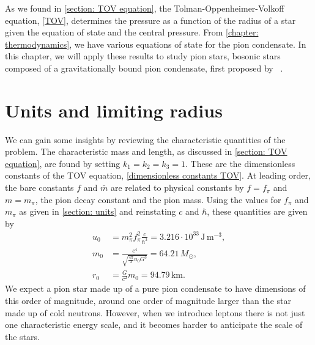 As we found in \autoref{section: TOV equation}, the Tolman-Oppenheimer-Volkoff equation, \autoref{TOV}, determines the pressure as a function of the radius of a star given the equation of state and the central pressure.
From \autoref{chapter: thermodynamics}, we have various equations of state for the pion condensate.
In this chapter, we will apply these results to study pion stars, bosonic stars composed of a gravitationally bound pion condensate, first proposed by \citeauthor{brandtNewClassCompact2018}~\autocite{brandtNewClassCompact2018}.



\section{Units and limiting radius}

We can gain some insights by reviewing the characteristic quantities of the problem.
The characteristic mass and length, as discussed in \autoref{section: TOV equation}, are found by setting $k_1 = k_2 = k_3 = 1$.
These are the dimensionless constants of the TOV equation, \autoref{dimensionless constants TOV}.
At leading order, the bare constants $f$ and $\bar m$ are related to physical constants by $f = f_\pi$ and $m = m_\pi$, the pion decay constant and the pion mass.
Using the values for $f_\pi$ and $m_\pi$ as given in \autoref{section: units} and reinstating $c$ and $\hbar$, these quantities are given by
%
\begin{align}
    u_0 & =m_\pi^2 f_\pi^2 \frac{c}{\hbar^3}
    = 3.216\cdot 10^{33} \, \text{J}\,\text{m}^{-3}, \\
    m_0 & = \frac{c^4}{\sqrt{\frac{4 \pi}{ 3} u_0 G^3}} = 64.21\, M_\odot, \\
    r_0 & = \frac{G}{c^2} m_0 = 94.79 \, \text{km}.
\end{align}
%
We expect a pion star made up of a pure pion condensate to have dimensions of this order of magnitude, around one order of magnitude larger than the star made up of cold neutrons.
However, when we introduce leptons there is not just one characteristic energy scale, and it becomes harder to anticipate the scale of the stars.



